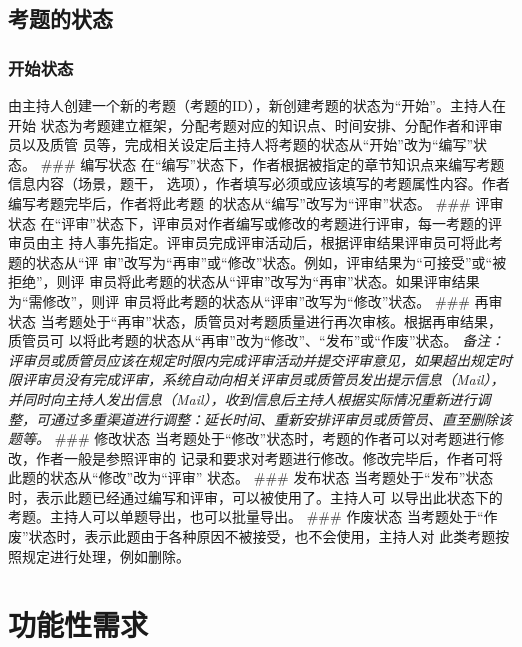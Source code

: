 \documentclass[hyperref, a4paper]{ctexart}
\begin{document}
\hypertarget{ux8003ux9898ux7684ux72b6ux6001}{%
\subsection{考题的状态}\label{ux8003ux9898ux7684ux72b6ux6001}}

\hypertarget{ux5f00ux59cbux72b6ux6001}{%
\subsubsection{开始状态}\label{ux5f00ux59cbux72b6ux6001}}

由主持人创建一个新的考题（考题的ID），新创建考题的状态为``开始''。主持人在开始
状态为考题建立框架，分配考题对应的知识点、时间安排、分配作者和评审员以及质管
员等，完成相关设定后主持人将考题的状态从``开始''改为``编写''状态。
\#\#\# 编写状态
在``编写''状态下，作者根据被指定的章节知识点来编写考题信息内容（场景，题干，
选项），作者填写必须或应该填写的考题属性内容。作者编写考题完毕后，作者将此考题
的状态从``编写''改写为``评审''状态。 \#\#\# 评审状态
在``评审''状态下，评审员对作者编写或修改的考题进行评审，每一考题的评审员由主
持人事先指定。评审员完成评审活动后，根据评审结果评审员可将此考题的状态从``评
审''改写为``再审''或``修改''状态。例如，评审结果为``可接受''或``被拒绝''，则评
审员将此考题的状态从``评审''改写为``再审''状态。如果评审结果为``需修改''，则评
审员将此考题的状态从``评审''改写为``修改''状态。 \#\#\# 再审状态
当考题处于``再审''状态，质管员对考题质量进行再次审核。根据再审结果，质管员可
以将此考题的状态从``再审''改为``修改''、``发布''或``作废''状态。
\emph{备注：评审员或质管员应该在规定时限内完成评审活动并提交评审意见，如果超出规定时限评审员没有完成评审，系统自动向相关评审员或质管员发出提示信息（Mail），并同时向主持人发出信息（Mail），收到信息后主持人根据实际情况重新进行调整，可通过多重渠道进行调整：延长时间、重新安排评审员或质管员、直至删除该题等。}
\#\#\# 修改状态
当考题处于``修改''状态时，考题的作者可以对考题进行修改，作者一般是参照评审的
记录和要求对考题进行修改。修改完毕后，作者可将此题的状态从``修改''改为``评审''
状态。 \#\#\# 发布状态
当考题处于``发布''状态时，表示此题已经通过编写和评审，可以被使用了。主持人可
以导出此状态下的考题。主持人可以单题导出，也可以批量导出。 \#\#\#
作废状态
当考题处于``作废''状态时，表示此题由于各种原因不被接受，也不会使用，主持人对
此类考题按照规定进行处理，例如删除。

\hypertarget{ux529fux80fdux6027ux9700ux6c42}{%
\section{功能性需求}\label{ux529fux80fdux6027ux9700ux6c42}}
\end{document}
